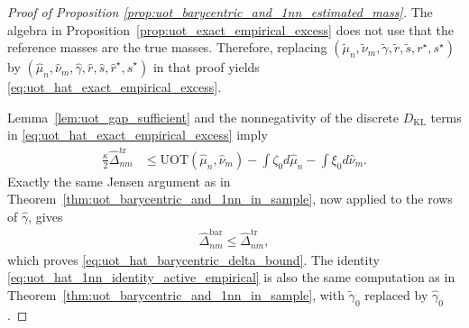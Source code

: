 \documentclass[11pt,reqno]{amsart}
\theoremstyle{definition}
\newcommand{\KL}{\mathrm{KL}}
\renewcommand{\hat}{\widehat}
\renewcommand{\tilde}{\widetilde}
\begin{document}
\begin{proof}[Proof of Proposition \ref{prop:uot_barycentric_and_1nn_estimated_mass}]
The algebra in Proposition~\ref{prop:uot_exact_empirical_excess} does not use that the reference masses are the true masses.
Therefore, replacing
\(
(\tilde\mu_n,\tilde\nu_m,\tilde\gamma,\tilde r,\tilde s,r^\star,s^\star)
\)
by
\(
(\hat\mu_n,\hat\nu_m,\hat\gamma,\hat r,\hat s,\hat r^\star,\hat s^\star)
\)
in that proof yields \eqref{eq:uot_hat_exact_empirical_excess}.

Lemma~\ref{lem:uot_gap_sufficient} and the nonnegativity of the {discrete $D_\KL$ terms} in \eqref{eq:uot_hat_exact_empirical_excess} imply
\begin{align}
    \frac{\kappa}{2}\hat\Delta_{nm}^{\mathrm{tr}}
    &\le
    \mathrm{UOT}(\hat\mu_n,\hat\nu_m)
    - \int \zeta_0   d\hat\mu_n
    - \int \xi_0   d\hat\nu_m.
\end{align}
Exactly the same Jensen argument as in Theorem~\ref{thm:uot_barycentric_and_1nn_in_sample}, now applied to the rows of $\hat\gamma$, gives
\begin{align}
    \hat\Delta_{nm}^{\mathrm{bar}} \le \hat\Delta_{nm}^{\mathrm{tr}},
\end{align}
which proves \eqref{eq:uot_hat_barycentric_delta_bound}.
The identity \eqref{eq:uot_hat_1nn_identity_active_empirical} is also the same computation as in Theorem~\ref{thm:uot_barycentric_and_1nn_in_sample}, with $\tilde\gamma_0$ replaced by $\hat\gamma_0$.


\end{proof}
\end{document}
